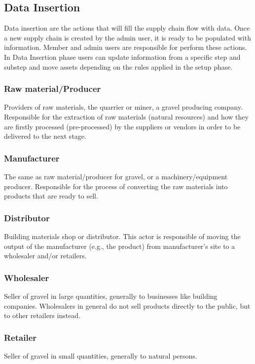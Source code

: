 \subsection{Data Insertion}\label{sec:DataInsertion}

Data insertion are the actions that will fill the supply chain flow with data. Once a new supply chain is created by the admin user, it is ready to be populated with information. Member and admin users are responsible for perform these actions. In Data Insertion phase users can update information from a specific step and substep and move assets depending on the rules applied in the setup phase.

\subsubsection{Raw material/Producer}\label{sec:Rawmaterial}
Providers of raw materials, the quarrier or miner, a gravel producing company. Responsible for the extraction of raw materials (natural resources) and how they are firstly processed (pre-processed) by the suppliers or vendors in order to be delivered to the next stage.

\subsubsection{Manufacturer}\label{sec:Manufacturer}
The same as raw material/producer for gravel, or a machinery/equipment producer. Responsible for the process of converting the raw materials into products that are ready to sell.

\subsubsection{Distributor}\label{sec:Distributor}
Building materials shop or distributor. This actor is responsible of moving the output of the manufacturer (e.g., the product) from manufacturer’s site to a wholesaler and/or retailers.

\subsubsection{Wholesaler}\label{sec:Wholesaler}
Seller of gravel in large quantities, generally to businesses like building companies. Wholesalers in general do not sell products directly to the public, but to other retailers instead.

\subsubsection{Retailer}\label{sec:Retailer}
Seller of gravel in small quantities, generally to natural persons.